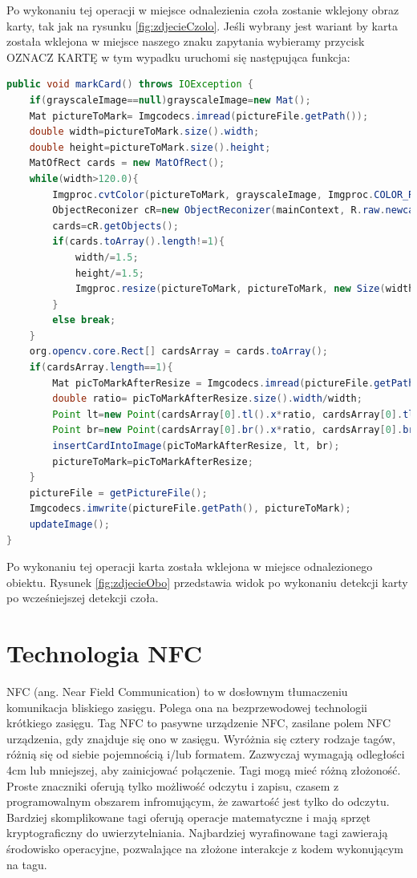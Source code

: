 \documentclass{article}
\let\stdsection\section
\renewcommand\section{\newpage\stdsection}
\numberwithin{equation}{section}
\begin{document}
Po wykonaniu tej operacji w miejsce odnalezienia czoła zostanie wklejony obraz karty, tak jak na rysunku \ref{fig:zdjecieCzolo}. 
Jeśli wybrany jest wariant by karta została wklejona w miejsce naszego znaku zapytania wybieramy przycisk OZNACZ KARTĘ w tym wypadku uruchomi się następująca funkcja:

\begin{lstlisting}[language=Java]
public void markCard() throws IOException {
    if(grayscaleImage==null)grayscaleImage=new Mat();
    Mat pictureToMark= Imgcodecs.imread(pictureFile.getPath());
    double width=pictureToMark.size().width;
    double height=pictureToMark.size().height;
    MatOfRect cards = new MatOfRect();
    while(width>120.0){
        Imgproc.cvtColor(pictureToMark, grayscaleImage, Imgproc.COLOR_RGBA2RGB);
        ObjectReconizer cR=new ObjectReconizer(mainContext, R.raw.newcard, "newcard.xml", grayscaleImage, 1.4, 25);
        cards=cR.getObjects();
        if(cards.toArray().length!=1){
            width/=1.5;
            height/=1.5;
            Imgproc.resize(pictureToMark, pictureToMark, new Size(width,height ));
        }
        else break;
    }
    org.opencv.core.Rect[] cardsArray = cards.toArray();
    if(cardsArray.length==1){
        Mat picToMarkAfterResize = Imgcodecs.imread(pictureFile.getPath());
        double ratio= picToMarkAfterResize.size().width/width;
        Point lt=new Point(cardsArray[0].tl().x*ratio, cardsArray[0].tl().y*ratio);
        Point br=new Point(cardsArray[0].br().x*ratio, cardsArray[0].br().y*ratio);
        insertCardIntoImage(picToMarkAfterResize, lt, br);
        pictureToMark=picToMarkAfterResize;
    }
    pictureFile = getPictureFile();
    Imgcodecs.imwrite(pictureFile.getPath(), pictureToMark);
    updateImage();
}
\end{lstlisting}

Po wykonaniu tej operacji karta została wklejona w miejsce odnalezionego obiektu. Rysunek \ref{fig:zdjecieObo} przedstawia widok po wykonaniu detekcji karty po wcześniejszej detekcji czoła.


\section{Technologia NFC}
NFC (ang. Near Field Communication) to w dosłownym tłumaczeniu komunikacja bliskiego zasięgu. Polega ona na bezprzewodowej technologii krótkiego zasięgu. Tag NFC to pasywne urządzenie NFC, zasilane polem NFC urządzenia, gdy znajduje się ono w zasięgu. Wyróżnia się cztery rodzaje tagów, różnią się od siebie pojemnością i/lub formatem.  Zazwyczaj wymagają odległości 4cm lub mniejszej, aby zainicjować połączenie.  Tagi mogą mieć różną złożoność. Proste znaczniki oferują tylko możliwość odczytu i zapisu, czasem z programowalnym obszarem infromującym, że zawartość jest tylko do odczytu. Bardziej skomplikowane tagi oferują operacje matematyczne i mają sprzęt kryptograficzny do uwierzytelniania. Najbardziej wyrafinowane tagi zawierają środowisko operacyjne, pozwalające na złożone interakcje z kodem wykonującym na tagu.
\end{document}
